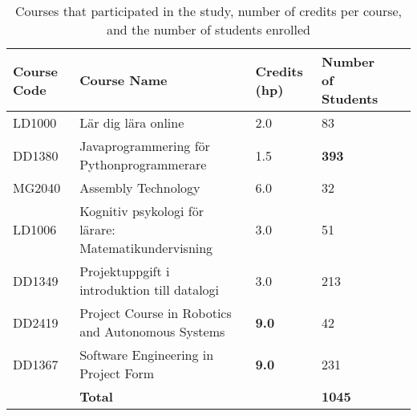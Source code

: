 \begin{table}[H]
\centering
{\scriptsize
\begin{tabularx}{\textwidth}{@{}llllc@{}}
\toprule
\textbf{Course Code} & \textbf{Course Name} & \textbf{Credits (hp)} & \textbf{Number of Students} \\ \midrule
LD1000 & Lär dig lära online & 2.0 & 83 \\
DD1380 & Javaprogrammering för Pythonprogrammerare & 1.5 & \textbf{393} \\
MG2040 & Assembly Technology & 6.0 & 32 \\
LD1006 & Kognitiv psykologi för lärare: Matematikundervisning & 3.0 & 51 \\
DD1349 & Projektuppgift i introduktion till datalogi & 3.0 & 213 \\
DD2419 & Project Course in Robotics and Autonomous Systems & \textbf{9.0} & 42 \\
DD1367 & Software Engineering in Project Form & \textbf{9.0} & 231 \\ \midrule
    & \textbf{Total} &  & \textbf{1045} \\
\bottomrule
\end{tabularx}
}
\vspace{2mm}
\caption{Courses that participated in the study, number of credits per course, and the number of students enrolled}
\label{tab:courses_credits_students}
\end{table}
